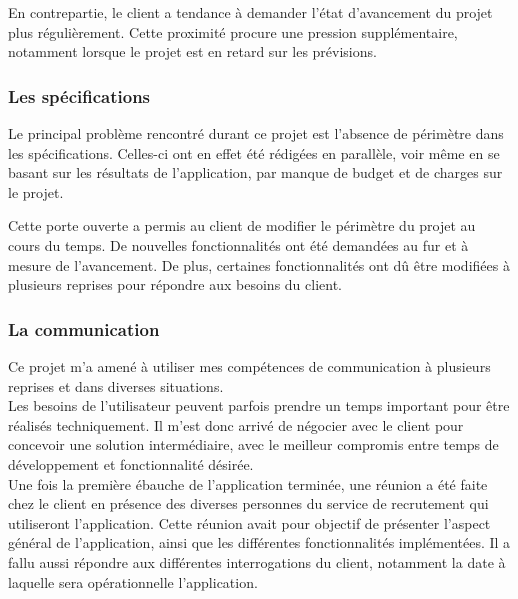 En contrepartie, le client a tendance à demander l'état d'avancement du projet plus régulièrement.
Cette proximité procure une pression supplémentaire, notamment lorsque le projet est en retard sur les prévisions.


\subsubsection{Les spécifications}

Le principal problème rencontré durant ce projet est l'absence de périmètre dans les spécifications.
Celles-ci ont en effet été rédigées en parallèle, voir même en se basant sur les résultats de l'application, par manque de budget et de charges sur le projet.

Cette porte ouverte a permis au client de modifier le périmètre du projet au cours du temps.
De nouvelles fonctionnalités ont été demandées au fur et à mesure de l'avancement.
De plus, certaines fonctionnalités ont dû être modifiées à plusieurs reprises pour répondre aux besoins du client.


\subsubsection{La communication}

Ce projet m'a amené à utiliser mes compétences de communication à plusieurs reprises et dans diverses situations.
\\

Les besoins de l'utilisateur peuvent parfois prendre un temps important pour être réalisés techniquement.
Il m'est donc arrivé de négocier avec le client pour concevoir une solution intermédiaire, avec le meilleur compromis entre temps de développement et fonctionnalité désirée.
\\

Une fois la première ébauche de l'application terminée, une réunion a été faite chez le client en présence des diverses personnes du service de recrutement qui utiliseront l'application.
Cette réunion avait pour objectif de présenter l'aspect général de l'application, ainsi que les différentes fonctionnalités implémentées.
Il a fallu aussi répondre aux différentes interrogations du client, notamment la date à laquelle sera opérationnelle l'application.